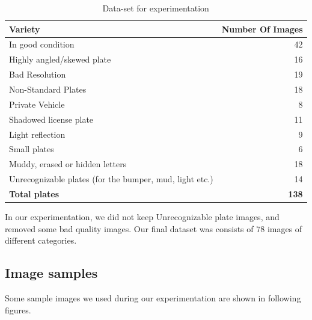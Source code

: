 \documentclass{standalone}
\begin{document}
\begin{table}    
    \caption{Data-set for experimentation}
    \label{table:Variety}
    \begin{tabular}{|l|r|}
    \hline
    {\bf Variety}  &  {\bf Number Of Images} \\ 
    \hline 
    In good condition &  42 \\ 
    Highly angled/skewed plate & 16 \\
    Bad Resolution & 19 \\ 
    Non-Standard Plates &  18\\    
    Private Vehicle & 8 \\
    Shadowed license plate & 11 \\    
    Light reflection & 9 \\
    Small plates & 6\\
    Muddy, erased or hidden letters & 18 \\
    Unrecognizable plates (for the bumper, mud, light etc.) & 14  \\
    \hline
    {\bf Total plates} & {\bf 138} \\
    \hline
    \end{tabular}
\end{table}

In our experimentation, we did not keep Unrecognizable plate images, and removed some bad quality images. Our final dataset was consists of $78$ images of different categories.

\subsection{Image samples}
Some sample images we used during our experimentation are shown in following figures.
\end{document}
